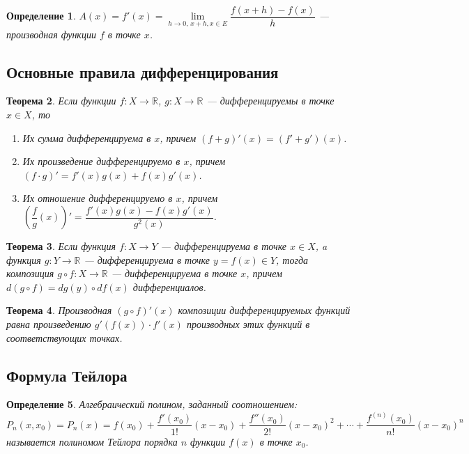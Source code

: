 \documentclass[12pt]{report}
\theoremstyle{plain}
\newtheorem{theorem}{Теорема}[chapter]
\newtheorem{definition}[theorem]{Определение}
\newcommand{\R}{\mathbb R}
\begin{document}
\begin{definition}
$A(x) = f'(x) = \lim\limits_{h\rightarrow 0,\, x+h, x\in E} \dfrac{f(x + h) - f(x)}{h}$ --- производная
функции $f$ в точке $x$.
\end{definition}

\subsection{Основные правила дифференцирования}
\begin{theorem}
Если функции $f: X \rightarrow \R$, $g: X \rightarrow \R$ --- дифференцируемы
в точке $x \in X$, то
\begin{enumerate}
  \item Их сумма дифференцируема в $x$, причем $(f + g)'(x) = (f' + g')(x)$.
  \item Их произведение дифференцируемо в $x$, причем $(f \cdot g)' = f'(x) g(x) + f(x) g'(x)$.
  \item Их отношение дифференцируемо в $x$, причем $\left(\dfrac{f}{g}(x)\right)' = \dfrac{f'(x) g(x) - f(x) g'(x)}{g^2(x)}$.
\end{enumerate}
\end{theorem}

\begin{theorem}
Если функция $f: X \rightarrow Y$ --- дифференцируема в точке $x \in X$,
a функция $g: Y \rightarrow \R$ --- дифференцируема в точке $y = f(x) \in Y$,
тогда композиция $g \circ f: X \rightarrow \R$ --- дифференцируема в точке $x$,
причем $d (g \circ f) = dg(y) \circ df(x)$ дифференциалов.
\end{theorem}

\begin{theorem}
Производная $(g \circ f)'(x)$ композиции дифференцируемых функций равна
произведению $g'(f(x)) \cdot f'(x)$ производных этих функций в соответствующих точках.
\end{theorem}

\subsection{Формула Тейлора}

\begin{definition}
Алгебраический полином, заданный соотношением:
$$
P_n(x, x_0) = P_n(x) = f(x_0) + \dfrac{f'(x_0)}{1!}(x - x_0) + \dfrac{f''(x_0)}{2!}(x - x_0)^2
+ \cdots + \dfrac{f^{(n)}(x_0)}{n!} (x - x_0)^n
$$
называется полиномом Тейлора порядка $n$ функции $f(x)$ в точке $x_0$.
\end{definition}
\end{document}
